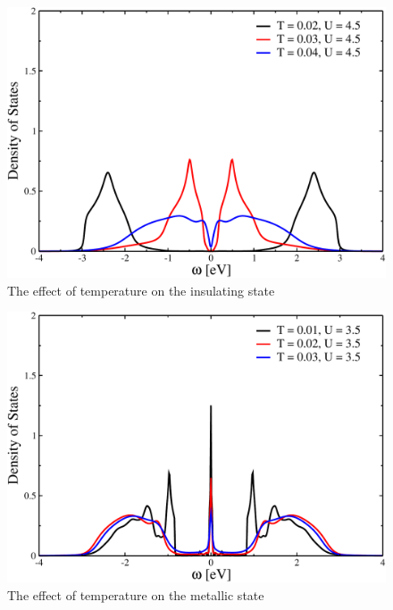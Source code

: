 \documentclass[aps,prl,twocolumn,showpacs,floatfix,superscriptaddress]{revtex4-1}
\begin{document}
	\begin{figure}
		\includegraphics[scale=0.3,angle=0]{tempins}
		\caption{The effect of temperature on the insulating state}
		\label{fig:5}
	\end{figure}
	
	\begin{figure}
		\includegraphics[scale=0.3,angle=0]{tempmetal}
		\caption{The effect of temperature on the metallic state}
		\label{fig:6}
	\end{figure}
\end{document}
